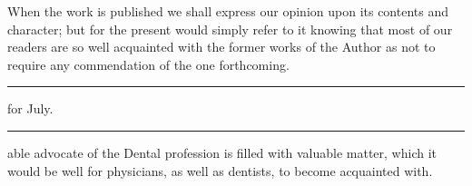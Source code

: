 When the work is published we shall express our opinion upon its
contents and character; but for the present would simply refer to it
knowing that most of our readers are so well acquainted with the former
works of the Author as not to require any commendation of the one
forthcoming.

\fancybreak{* * *}
\footnotesize
{} for July.
\plainbreak{1}
\normalsize

 able advocate of the Dental profession is filled with valuable
matter, which it would be well for physicians, as well as dentists, to
become acquainted with.\endinput
